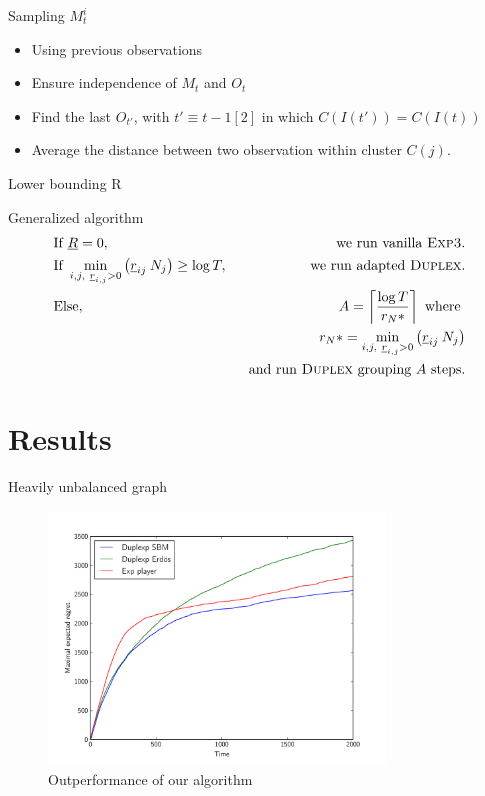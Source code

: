 \documentclass[11pt)]{beamer}
\begin{document}
\begin{frame}{Sampling $M_t^i$}
\begin{itemize}
\item Using previous observations
\item Ensure independence of $M_t$ and $O_t$
\item Find the last $O_{t'}$, with $t' \equiv t -1 [2]$ in which $C(I(t')) = C(I(t))$
\item Average the distance between two observation within cluster $C(j)$.
\end{itemize}
\end{frame}

\begin{frame}{Lower bounding R}

\end{frame}

\begin{frame}{Generalized algorithm}
\begin{align*}
&\text{If }\underline{R}=0,\ & \text{ we run vanilla } \textsc{Exp3}.\\
&\text{If } \min_{i,j,\ \underline{r}_{i,j}>0} \left(\underline{r}_{ij}\: N_j \right) \geq \log T ,\  & \text{ we run adapted }\textsc{Duplex}. \\
&\text{Else},\ & A =\left\lceil \frac{\log T}{r_N*} \right\rceil \text{ where }\\
& & r_N*=\min_{i,j,\ \underline{r}_{i,j}>0} \left(\underline{r}_{ij}\: N_j \right) \\
& & \text{ and run } \textsc{Duplex} \text{ grouping } A \text{ steps}.  
\end{align*}
\end{frame}

\section{Results}

\begin{frame}{Heavily unbalanced graph}

\begin{figure}[ht]
	\centering
	\includegraphics[width=0.8\textwidth]{hard}
	\caption{Outperformance of our algorithm}
	\label{fig:hard}
\end{figure}

\end{frame}
\end{document}
